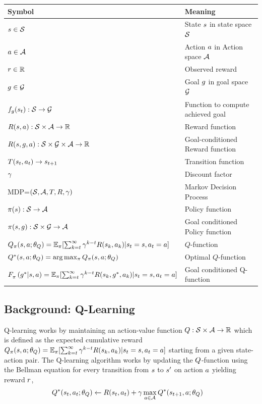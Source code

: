 \begin{tabular}{ll}   
  \toprule
  Symbol & Meaning\\
  \midrule
  $s \in \mathcal{S}$ & State $s$ in state space $\mathcal{S}$ \\
  $a \in \mathcal{A}$ & Action $a$ in Action space $\mathcal{A}$ \\
  $r \in \mathbb{R}$ & Observed reward \\
  $g \in \mathcal{G}$ & Goal $g$ in goal space $\mathcal{G}$ \\
  $f_g(s_t): \mathcal{S} \rightarrow \mathcal{G}$ & Function to compute achieved goal \\
  $R(s, a) : \mathcal{S} \times \mathcal{A} \rightarrow \mathbb{R} $ & Reward function \\
  $R(s, g, a) : \mathcal{S} \times \mathcal{G} \times \mathcal{A} \rightarrow \mathbb{R} $ & Goal-conditioned Reward function \\
  $T(s_t, a_t) \rightarrow s_{t+1}$ & Transition function \\
  $\gamma$ & Discount factor \\
  MDP=$(\mathcal{S}, \mathcal{A}, T, R, \gamma)$& Markov Decision Process \\
  $\pi(s): \mathcal{S} \rightarrow \mathcal{A} $ & Policy function \\
  $\pi(s, g): \mathcal{S} \times \mathcal{G} \rightarrow \mathcal{A} $ & Goal conditioned Policy function \\
  $Q_\pi(s, a; \theta_Q) = \mathbb{E}_\pi[ \sum_{k=t}^\infty \gamma^{k-t} R(s_k, a_k) | s_t = s, a_t = a ] $ & $Q$-function \\
  $Q^*(s, a; \theta_Q) = \arg \max_\pi Q_\pi(s, a; \theta_Q)$ & Optimal $Q$-function \\
  $F_{\pi}^{}\left({g^*}\middle|{s}, {a}\right) = \mathbb{E}_\pi[ \sum_{k=t}^\infty \gamma^{k-t}R(s_k, g^*, a_k) | s_t = s, a_t = a]$ & Goal conditioned Q-function \\
  \bottomrule
\end{tabular}

\subsection{Background: Q-Learning}

Q-learning works by maintaining an action-value function $Q : \mathcal{S} \times
\mathcal{A} \rightarrow \mathbb{R}$ which is defined as the expected cumulative reward
  $Q_\pi(s, a; \theta_Q) = \mathbb{E}_\pi[ \sum_{k=t}^\infty
  \gamma^{k-t} R(s_k, a_k) | s_t = s, a_t = a ]$
  starting from a given state-action pair.
The Q-learning algorithm works by updating the $Q$-function using the Bellman
equation for every transition from $s$ to $s'$ on action $a$
yielding reward $r$, 
%
\begin{align}
Q^*(s_t, a_t; \theta_Q) &\leftarrow R(s_t, a_t) + \gamma \max_{a \in \mathcal{A}} Q^*(s_{t+1}, a; \theta_Q)
                                    \label{eq:bellman}
\end{align}

